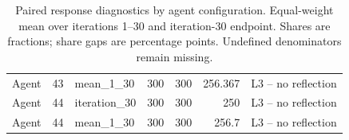\begin{table}[htbp!]
\begin{tabular}{lrlrrrl}
Agent & 43 & mean\_1\_30 & 300 & 300 & 256.367 & L3 -- no reflection \\
Agent & 44 & iteration\_30 & 300 & 300 & 250 & L3 -- no reflection \\
Agent & 44 & mean\_1\_30 & 300 & 300 & 256.7 & L3 -- no reflection \\
\hline
\end{tabular}
\caption{Paired response diagnostics by agent configuration. Equal-weight mean over iterations 1--30 and iteration-30 endpoint. Shares are fractions; share gaps are percentage points. Undefined denominators remain missing.}
\label{chap:results:tab:rq3_agents_eligibility}
\end{table}
